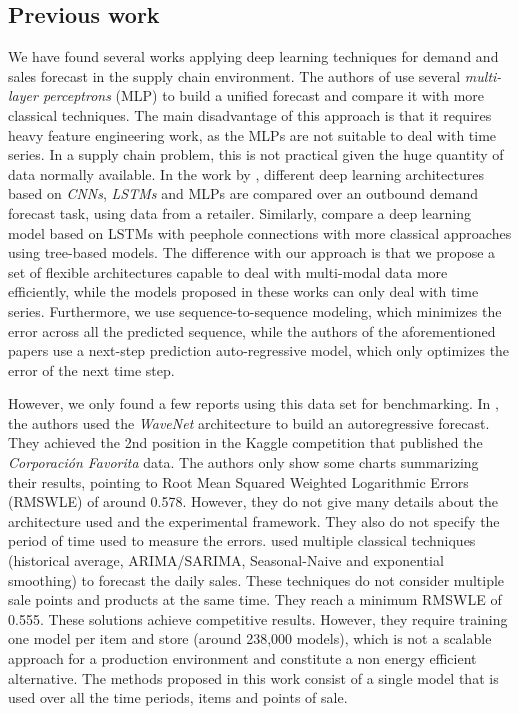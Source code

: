 \subsection{Previous work}	\label{sec:salesforecast_prevwork}
We have found several works applying deep learning techniques for demand and sales forecast in the supply chain environment. The authors of \autocite{Kilimci2019} use several \textit{multi-layer perceptrons} (MLP) to build a unified forecast and compare it with more classical techniques. The main disadvantage of this approach is that it requires heavy feature engineering work, as the MLPs are not suitable to deal with time series. In a supply chain problem, this is not practical given the huge quantity of data normally available. In the work by \autocite{Talupula2018}, different deep learning architectures based on \textit{CNNs}, \textit{LSTMs} and MLPs are compared over an outbound demand forecast task, using data from a retailer. Similarly, \autocite{Helmini2019} compare a deep learning model based on LSTMs with peephole connections with more classical approaches using tree-based models.  The difference with our approach is that we propose a set of flexible architectures capable to deal with multi-modal data more efficiently, while the models proposed in these works can only deal with time series. Furthermore, we use sequence-to-sequence modeling, which minimizes the error across all the predicted sequence, while the authors of the aforementioned papers use a next-step prediction auto-regressive model, which only optimizes the error of the next time step.

However, we only found a few reports using this data set for benchmarking. In \autocite{kechyn2018}, the authors used the \textit{WaveNet} \autocite{vanderoord2016} architecture to build an autoregressive forecast. They achieved the 2nd position in the Kaggle competition that published the \textit{Corporación Favorita} data. The authors only show some charts summarizing their results, pointing to Root Mean Squared Weighted Logarithmic Errors (RMSWLE) of around 0.578. However, they do not give many details about the architecture used and the experimental framework. They also do not specify the period of time used to measure the errors. \autocite{Steves2018} used multiple classical techniques (historical average, ARIMA/SARIMA, Seasonal-Naive and exponential smoothing) to forecast the daily sales. These techniques do not consider multiple sale points and products at the same time. They reach a minimum RMSWLE of 0.555. These solutions achieve competitive results. However, they require training one model per item and store (around 238,000 models), which is not a scalable approach for a production environment and constitute a non energy efficient alternative. The methods proposed in this work consist of a single model that is used over all the time periods, items and points of sale.

